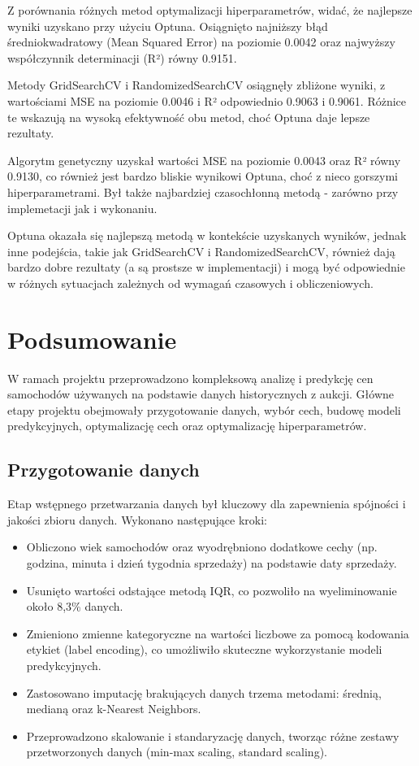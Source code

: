 \documentclass[10pt,letterpaper]{article}
\begin{document}
	Z porównania różnych metod optymalizacji hiperparametrów, widać, że najlepsze wyniki uzyskano przy użyciu Optuna. Osiągnięto najniższy błąd średniokwadratowy (Mean Squared Error) na poziomie 0.0042 oraz najwyższy współczynnik determinacji (R²) równy 0.9151. 
	
	Metody GridSearchCV i RandomizedSearchCV osiągnęły zbliżone wyniki, z wartościami MSE na poziomie 0.0046 i R² odpowiednio 0.9063 i 0.9061. Różnice te wskazują na wysoką efektywność obu metod, choć Optuna daje lepsze rezultaty.
	
	Algorytm genetyczny uzyskał wartości MSE na poziomie 0.0043 oraz R² równy 0.9130, co również jest bardzo bliskie wynikowi Optuna, choć z nieco gorszymi hiperparametrami. Był także najbardziej czasochłonną metodą - zarówno przy implemetacji jak i wykonaniu.
	
	Optuna okazała się najlepszą metodą w kontekście uzyskanych wyników, jednak inne podejścia, takie jak GridSearchCV i RandomizedSearchCV, również dają bardzo dobre rezultaty (a są prostsze w implementacji) i mogą być odpowiednie w różnych sytuacjach zależnych od wymagań czasowych i obliczeniowych.
	
	\newpage
	\section{Podsumowanie}
	
	W ramach projektu przeprowadzono kompleksową analizę i predykcję cen samochodów używanych na podstawie danych historycznych z aukcji. Główne etapy projektu obejmowały przygotowanie danych, wybór cech, budowę modeli predykcyjnych, optymalizację cech oraz optymalizację hiperparametrów.
	
	\subsection*{Przygotowanie danych}
	Etap wstępnego przetwarzania danych był kluczowy dla zapewnienia spójności i jakości zbioru danych. Wykonano następujące kroki:
	\begin{itemize}
		\item Obliczono wiek samochodów oraz wyodrębniono dodatkowe cechy (np. godzina, minuta i dzień tygodnia sprzedaży) na podstawie daty sprzedaży.
		\item Usunięto wartości odstające metodą IQR, co pozwoliło na wyeliminowanie około 8,3\% danych.
		\item Zmieniono zmienne kategoryczne na wartości liczbowe za pomocą kodowania etykiet (label encoding), co umożliwiło skuteczne wykorzystanie modeli predykcyjnych.
		\item Zastosowano imputację brakujących danych trzema metodami: średnią, medianą oraz k-Nearest Neighbors.
		\item Przeprowadzono skalowanie i standaryzację danych, tworząc różne zestawy przetworzonych danych (min-max scaling, standard scaling).
	\end{itemize}
	
\end{document}
